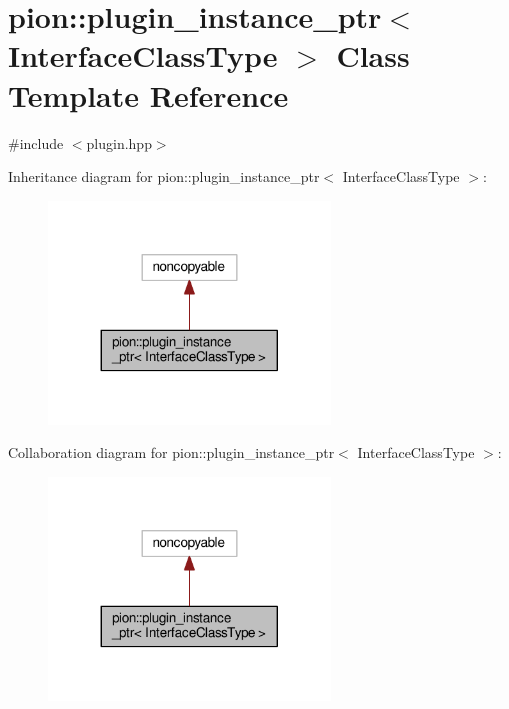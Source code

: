 \hypertarget{classpion_1_1plugin__instance__ptr}{\section{pion\-:\-:plugin\-\_\-instance\-\_\-ptr$<$ Interface\-Class\-Type $>$ Class Template Reference}
\label{classpion_1_1plugin__instance__ptr}
}


{\ttfamily \#include $<$plugin.\-hpp$>$}



Inheritance diagram for pion\-:\-:plugin\-\_\-instance\-\_\-ptr$<$ Interface\-Class\-Type $>$\-:
\nopagebreak
\begin{figure}[H]
\begin{center}
\leavevmode
\includegraphics[width=212pt]{classpion_1_1plugin__instance__ptr__inherit__graph}
\end{center}
\end{figure}


Collaboration diagram for pion\-:\-:plugin\-\_\-instance\-\_\-ptr$<$ Interface\-Class\-Type $>$\-:
\nopagebreak
\begin{figure}[H]
\begin{center}
\leavevmode
\includegraphics[width=212pt]{classpion_1_1plugin__instance__ptr__coll__graph}
\end{center}
\end{figure}
